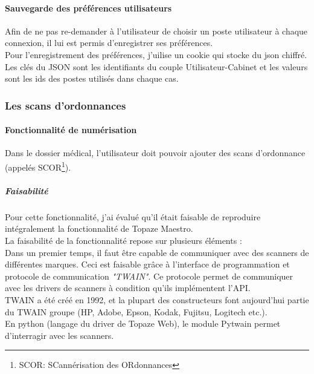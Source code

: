 \paragraph*{Sauvegarde des préférences utilisateurs\\}
Afin de ne pas re-demander à l'utilisateur de choisir un poste utilisateur à chaque connexion, il lui est permis d'enregistrer ses préférences.\\
Pour l'enregistrement des préférences, j'uilise un cookie qui stocke du json chiffré. Les clés du JSON sont les identifiants du couple Utilisateur-Cabinet et les valeurs sont les ids des postes utilisés dans chaque cas.






\subsubsection{Les scans d'ordonnances}
\paragraph*{Fonctionnalité de numérisation\\}
Dans le dossier médical, l'utilisateur doit pouvoir ajouter des scans d'ordonnance (appelés SCOR\footnote{SCOR: SCannérisation des ORdonnances}).

\subparagraph*{Faisabilité}
Pour cette fonctionnalité, j'ai évalué qu'il était faisable de reproduire intégralement la fonctionnalité de Topaze Maestro.\\

La faisabilité de la fonctionnalité repose sur plusieurs éléments :\\
Dans un premier temps, il faut être capable de communiquer avec des scanners de différentes marques. Ceci est faisable grâce à l'interface de programmation et protocole de communication \textit{"TWAIN"}. Ce protocole permet de communiquer avec les drivers de  scanners à condition qu'ils implémentent l'API.\\
TWAIN a été créé en 1992\cite{bib:twain}, et la plupart des constructeurs font aujourd'hui partie du TWAIN groupe (HP, Adobe, Epson, Kodak, Fujitsu, Logitech etc.).\\
En python (langage du driver de Topaze Web), le module Pytwain permet d'interragir avec les scanners.\\

